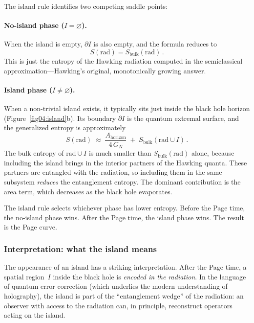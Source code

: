 \documentclass[11pt,letterpaper]{article}
\theoremstyle{plain}
\theoremstyle{definition}
\theoremstyle{remark}
\begin{document}
The island rule identifies two competing saddle points:

\paragraph{No-island phase ($I = \varnothing$).}
When the island is empty, $\partial I$ is also empty, and the formula
reduces to
\begin{equation}
\label{eq04:no_island}
S(\mathrm{rad}) = S_{\mathrm{bulk}}(\mathrm{rad})\,.
\end{equation}
This is just the entropy of the Hawking radiation computed in the
semiclassical approximation---Hawking's original, monotonically
growing answer.

\paragraph{Island phase ($I \neq \varnothing$).}
When a non-trivial island exists, it typically sits just inside the
black hole horizon (Figure~\ref{fig04:island}b).  Its boundary
$\partial I$ is the quantum extremal surface, and the generalized
entropy is approximately
\begin{equation}
\label{eq04:island_phase}
S(\mathrm{rad}) \;\approx\;
\frac{A_{\mathrm{horizon}}}{4\,G_{N}}
\;+\; S_{\mathrm{bulk}}(\mathrm{rad} \cup I)\,.
\end{equation}
The bulk entropy of $\mathrm{rad}\cup I$ is much smaller than
$S_{\mathrm{bulk}}(\mathrm{rad})$ alone, because including the
island brings in the interior partners of the Hawking quanta.
These partners are entangled with the radiation, so including
them in the same subsystem \emph{reduces} the entanglement
entropy.  The dominant contribution is the area term, which
decreases as the black hole evaporates.

The island rule selects whichever phase has lower entropy.  Before
the Page time, the no-island phase wins.  After the Page time, the
island phase wins.  The result is the Page curve.

\subsubsection*{Interpretation: what the island means}

The appearance of an island has a striking interpretation.  After the
Page time, a spatial region~$I$ inside the black hole is
\emph{encoded in the radiation}.  In the language of quantum error
correction (which underlies the modern understanding of holography),
the island is part of the ``entanglement wedge'' of the radiation:
an observer with access to the radiation can, in principle,
reconstruct operators acting on the island.
\end{document}

